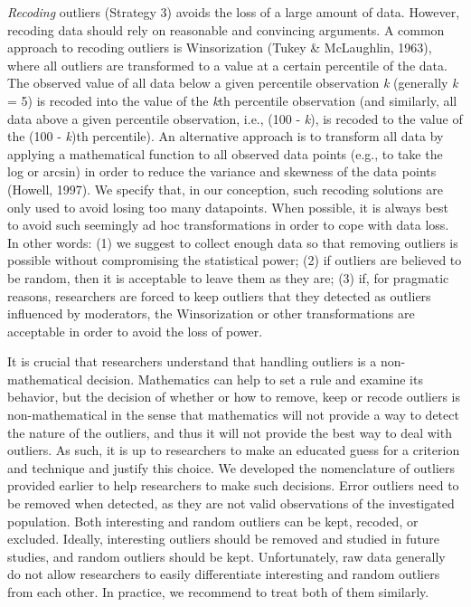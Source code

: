 \documentclass[man,floatsintext]{apa6}
\begin{document}
\emph{Recoding} outliers (Strategy 3) avoids the loss of a large amount
of data. However, recoding data should rely on reasonable and convincing
arguments. A common approach to recoding outliers is Winsorization
(Tukey \& McLaughlin, 1963), where all outliers are transformed to a
value at a certain percentile of the data. The observed value of all
data below a given percentile observation \emph{k} (generally \emph{k} =
5) is recoded into the value of the \emph{k}th percentile observation
(and similarly, all data above a given percentile observation, i.e.,
(100 - \emph{k}), is recoded to the value of the (100 - \emph{k})th
percentile). An alternative approach is to transform all data by
applying a mathematical function to all observed data points (e.g., to
take the log or arcsin) in order to reduce the variance and skewness of
the data points (Howell, 1997). We specify that, in our conception, such
recoding solutions are only used to avoid losing too many datapoints.
When possible, it is always best to avoid such seemingly ad hoc
transformations in order to cope with data loss. In other words: (1) we
suggest to collect enough data so that removing outliers is possible
without compromising the statistical power; (2) if outliers are believed
to be random, then it is acceptable to leave them as they are; (3) if,
for pragmatic reasons, researchers are forced to keep outliers that they
detected as outliers influenced by moderators, the Winsorization or
other transformations are acceptable in order to avoid the loss of
power.

It is crucial that researchers understand that handling outliers is a
non-mathematical decision. Mathematics can help to set a rule and
examine its behavior, but the decision of whether or how to remove, keep
or recode outliers is non-mathematical in the sense that mathematics
will not provide a way to detect the nature of the outliers, and thus it
will not provide the best way to deal with outliers. As such, it is up
to researchers to make an educated guess for a criterion and technique
and justify this choice. We developed the nomenclature of outliers
provided earlier to help researchers to make such decisions. Error
outliers need to be removed when detected, as they are not valid
observations of the investigated population. Both interesting and random
outliers can be kept, recoded, or excluded. Ideally, interesting
outliers should be removed and studied in future studies, and random
outliers should be kept. Unfortunately, raw data generally do not allow
researchers to easily differentiate interesting and random outliers from
each other. In practice, we recommend to treat both of them similarly.
\end{document}
